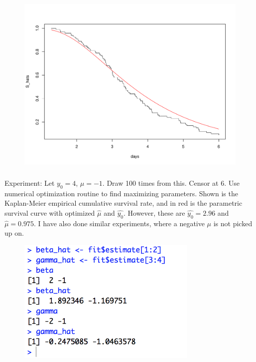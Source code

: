 \begin{figure}[H]\centering\includegraphics[height=9cm]
    {figures/simulated-IG.pdf}
\end{figure}
Experiment: Let $y_0=4$, $\mu=-1$. Draw 100 times from this. Censor at 6. Use numerical optimization routine to find maximizing parameters. Shown is the Kaplan-Meier empirical cumulative survival rate, and in red is the parametric survival curve with optimized $\hat{\mu}$ and $\hat{y_0}$. However, these are $\hat{y_0}=2.96$ and $\hat{\mu}=0.975$. I have also done similar experiments, where a negative $\mu$ is not picked up on.

\begin{figure}\centering\includegraphics[height=6cm]
    {figures/params.png}
\end{figure}